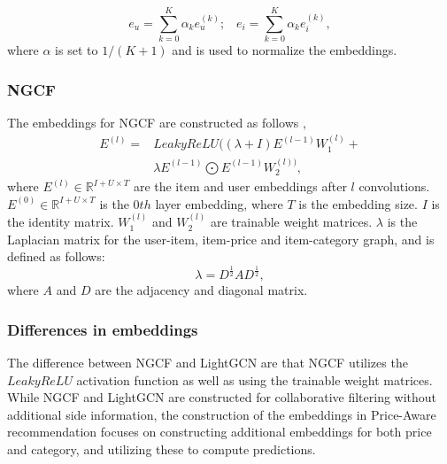 \begin{equation}
    e_u = \sum_{k=0}^{K} \alpha_k e_u^{(k)};\;\;\; e_i = \sum_{k=0}^{K} \alpha_k e_i^{(k)},
\end{equation}
where $\alpha$ is set to $1/(K + 1)$ and is used to normalize the embeddings.

\subsubsection{NGCF}\label{subsubsec:NGCF-embed}
The embeddings for NGCF are constructed as follows \cite{NGCF_2019},
\begin{equation}
    \begin{split}
        E^{(l)} = &LeakyReLU((\lambda + I)E^{(l-1)}W_1^{(l)}+\\
        & \lambda E^{(l-1)}\bigodot E^{(l-1)}W_2^{(l))},
    \end{split}
\end{equation}
where $E^{(l)} \in \mathbb{R}^{I+U \times T}$ are the item and user embeddings after $l$ convolutions.
$E^{(0)} \in \mathbb{R}^{I+U \times T}$ is the $0th$ layer embedding, where $T$ is the embedding size.
$I$ is the identity matrix.
$W_1^{(l)}$ and $W_2^{(l)}$ are trainable weight matrices.
$\lambda$ is the Laplacian matrix for the user-item, item-price and item-category graph, and is defined as follows:
\begin{equation}
    \lambda = D^{\frac{1}{2}}AD^{\frac{1}{2}},
\end{equation}
where $A$ and $D$ are the adjacency and diagonal matrix.

\subsubsection{Differences in embeddings}
The difference between NGCF and LightGCN are that NGCF utilizes the $LeakyReLU$ activation function as well as using the trainable weight matrices.
While NGCF and LightGCN are constructed for collaborative filtering without additional side information, the construction of the embeddings in Price-Aware recommendation focuses on constructing additional embeddings for both price and category, and utilizing these to compute predictions.

